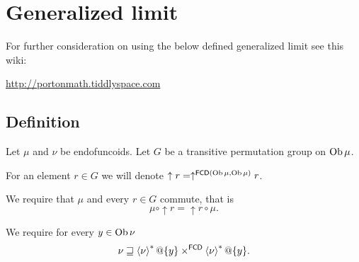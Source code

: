 \section{Generalized limit}

For further consideration on using the below defined generalized limit
see this wiki:

\href{http://portonmath.tiddlyspace.com}{http://portonmath.tiddlyspace.com}


\subsection{Definition}

Let $\mu$ and $\nu$ be endofuncoids. Let $G$ be a transitive permutation
group on $\operatorname{Ob}\mu$.

For an element $r\in G$ we will denote $\uparrow r=\uparrow^{\mathsf{FCD}(\operatorname{Ob}\mu,\operatorname{Ob}\mu)}r$.

We require that $\mu$ and every $r\in G$ commute, that is
\[
\mu\circ\uparrow r=\uparrow r\circ\mu.
\]


We require for every $y\in\operatorname{Ob}\nu$ 
\begin{equation}
\nu\sqsupseteq\left\langle \nu\right\rangle ^{\ast}@\{y\}\times^{\mathsf{FCD}}\left\langle \nu\right\rangle ^{\ast}@\{y\}.\label{lim-squares}
\end{equation}

